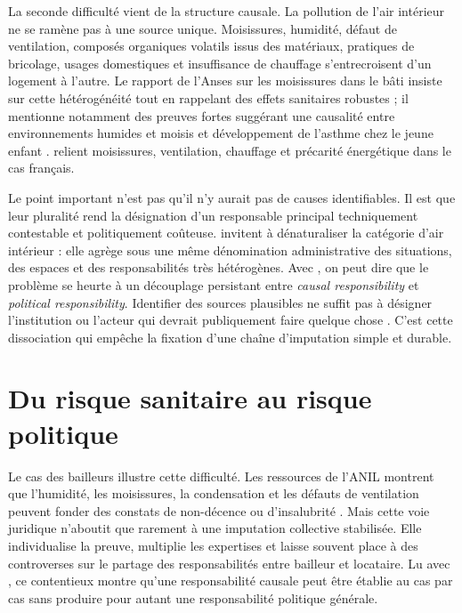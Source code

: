 \documentclass[a4paper,12pt,twoside]{book}
\begin{document}
La seconde difficulté vient de la structure causale. La pollution de l'air intérieur ne se ramène pas à une source unique. Moisissures, humidité, défaut de ventilation, composés organiques volatils issus des matériaux, pratiques de bricolage, usages domestiques et insuffisance de chauffage s'entrecroisent d'un logement à l'autre. Le rapport de l'Anses sur les moisissures dans le bâti insiste sur cette hétérogénéité tout en rappelant des effets sanitaires robustes ; il mentionne notamment des preuves fortes suggérant une causalité entre environnements humides et moisis et développement de l'asthme chez le jeune enfant \parencite{Anses2016MoisissuresBati}. \textcite{Ginestet2020MouldIndoorEnvironments} relient moisissures, ventilation, chauffage et précarité énergétique dans le cas français.

Le point important n'est pas qu'il n'y aurait pas de causes identifiables. Il est que leur pluralité rend la désignation d'un responsable principal techniquement contestable et politiquement coûteuse. \textcite{FerronLeBourhis2020DeconstruireProblemesPublics} invitent à dénaturaliser la catégorie d'\og air intérieur \fg : elle agrège sous une même dénomination administrative des situations, des espaces et des responsabilités très hétérogènes. Avec \textcite{Gusfield1981CulturePublicProblems}, on peut dire que le problème se heurte à un découplage persistant entre \emph{causal responsibility} et \emph{political responsibility}. Identifier des sources plausibles ne suffit pas à désigner l'institution ou l'acteur qui devrait publiquement \og faire quelque chose \fg. C'est cette dissociation qui empêche la fixation d'une chaîne d'imputation simple et durable.

\section{Du risque sanitaire au risque politique}

Le cas des bailleurs illustre cette difficulté. Les ressources de l'ANIL montrent que l'humidité, les moisissures, la condensation et les défauts de ventilation peuvent fonder des constats de non-décence ou d'insalubrité \parencite{ANILJurisprudence2025,ANILHabitatIndigne2025}. Mais cette voie juridique n'aboutit que rarement à une imputation collective stabilisée. Elle individualise la preuve, multiplie les expertises et laisse souvent place à des controverses sur le partage des responsabilités entre bailleur et locataire. Lu avec \textcite{Gusfield1981CulturePublicProblems}, ce contentieux montre qu'une responsabilité causale peut être établie au cas par cas sans produire pour autant une responsabilité politique générale.
\end{document}
